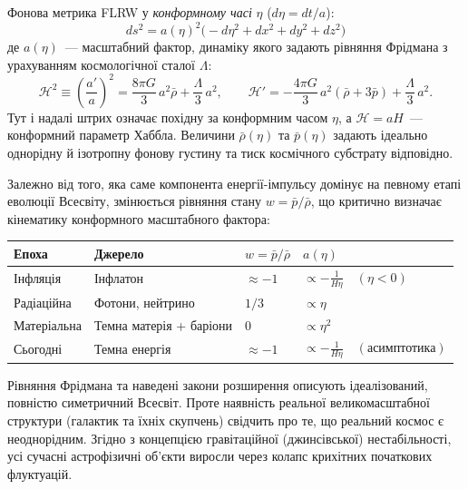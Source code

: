 \documentclass[12pt, a4paper]{article}
\begin{document}
Фонова метрика FLRW у \emph{конформному часі} $\eta$ ($d\eta = dt/a$):
\begin{equation*}
  ds^2 = a(\eta)^2\bigl(-d\eta^2 + dx^2 + dy^2 + dz^2\bigr)
\end{equation*}
де $a(\eta)$~--- масштабний фактор, динаміку якого задають рівняння Фрідмана з урахуванням космологічної сталої $\Lambda$:
\begin{equation*}
  \mathcal{H}^2 \equiv \left(\frac{a'}{a}\right)^2 = \frac{8\pi G}{3}\,a^2\bar{\rho} + \frac{\Lambda}{3}\,a^2,
  \qquad
  \mathcal{H}' = -\frac{4\pi G}{3}\,a^2(\bar{\rho} + 3\bar{p}) + \frac{\Lambda}{3}\,a^2.
\end{equation*}
Тут і надалі штрих означає похідну за конформним часом $\eta$, а $\mathcal{H} = aH$~--- конформний параметр Хаббла. Величини $\bar{\rho}(\eta)$ та $\bar{p}(\eta)$ задають ідеально однорідну й ізотропну фонову густину та тиск космічного субстрату відповідно.

Залежно від того, яка саме компонента енергії-імпульсу домінує на певному етапі еволюції Всесвіту, змінюється рівняння стану $w = \bar{p}/\bar{\rho}$, що критично визначає кінематику конформного масштабного фактора:

\begin{center}
\begin{tabular}{llll}
\toprule
Епоха & Джерело & $w = \bar{p}/\bar{\rho}$ & $a(\eta)$ \\
\midrule
Інфляція     & Інфлатон                & $\approx -1$ & $\propto -\frac{1}{H\eta} \quad (\eta < 0)$ \\
Радіаційна   & Фотони, нейтрино        & $1/3$        & $\propto \eta$ \\
Матеріальна  & Темна матерія + баріони & $0$          & $\propto \eta^2$ \\
Сьогодні     & Темна енергія           & $\approx -1$ & $\propto -\frac{1}{H\eta} \quad (\text{асимптотика})$ \\
\bottomrule
\end{tabular}
\end{center}

Рівняння Фрідмана та наведені закони розширення описують ідеалізований, повністю симетричний Всесвіт. Проте наявність реальної великомасштабної структури (галактик та їхніх скупчень) свідчить про те, що реальний космос є неоднорідним. Згідно з концепцією гравітаційної (джинсівської) нестабільності, усі сучасні астрофізичні об'єкти виросли через колапс крихітних початкових флуктуацій.
\end{document}
